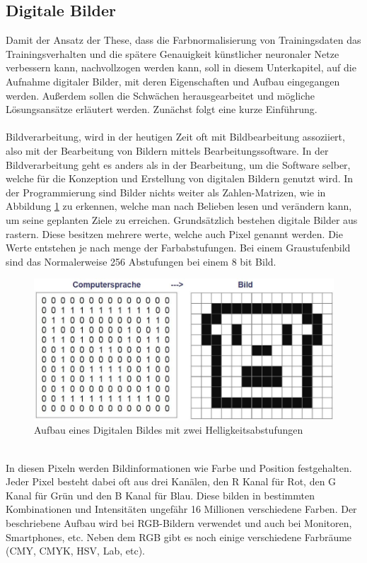 \documentclass[a4paper,12pt,oneside]{article}
\begin{document}
  \subsection{Digitale Bilder}\label{s.digibilder}
  Damit der Ansatz der These, dass die Farbnormalisierung von Trainingsdaten das Trainingsverhalten und die spätere Genauigkeit künstlicher neuronaler Netze verbessern kann, nachvollzogen werden kann, soll in diesem Unterkapitel, auf die Aufnahme digitaler Bilder, mit deren Eigenschaften und Aufbau eingegangen werden. Außerdem sollen die Schwächen herausgearbeitet und mögliche Lösungsansätze erläutert werden. Zunächst folgt eine kurze Einführung.\\\\
Bildverarbeitung, wird in der heutigen Zeit oft mit Bildbearbeitung assoziiert, also mit der Bearbeitung von Bildern mittels Bearbeitungssoftware. In der Bildverarbeitung geht es anders als in der Bearbeitung, um die Software selber, welche für die Konzeption und Erstellung von digitalen Bildern genutzt wird. In der Programmierung sind Bilder nichts weiter als Zahlen-Matrizen, wie in Abbildung \ref{img:digitalesbild} zu erkennen, welche man nach Belieben lesen und verändern kann, um seine geplanten Ziele zu erreichen. Grundsätzlich bestehen digitale Bilder aus rastern. Diese besitzen mehrere werte, welche auch Pixel genannt werden. Die Werte entstehen je nach menge der Farbabstufungen. Bei einem Graustufenbild sind das Normalerweise 256 Abstufungen bei einem 8 bit Bild. 
\begin{figure}
[h]
\centering
\includegraphics[scale=0.5]{Sources/Digitalesbild.JPG}
\caption{Aufbau eines Digitalen Bildes mit zwei Helligkeitsabstufungen}
\label{img:digitalesbild}
\end{figure}\\
In diesen Pixeln werden Bildinformationen wie Farbe und Position festgehalten. Jeder Pixel besteht dabei oft aus drei Kanälen, den R Kanal für Rot, den G Kanal für Grün und den B Kanal für Blau. Diese bilden in bestimmten Kombinationen und Intensitäten ungefähr 16 Millionen verschiedene Farben. Der beschriebene Aufbau wird bei RGB-Bildern verwendet und auch bei Monitoren, Smartphones, etc. Neben dem RGB gibt es noch einige verschiedene Farbräume (CMY, CMYK, HSV, Lab, etc).\\\\
\end{document}
